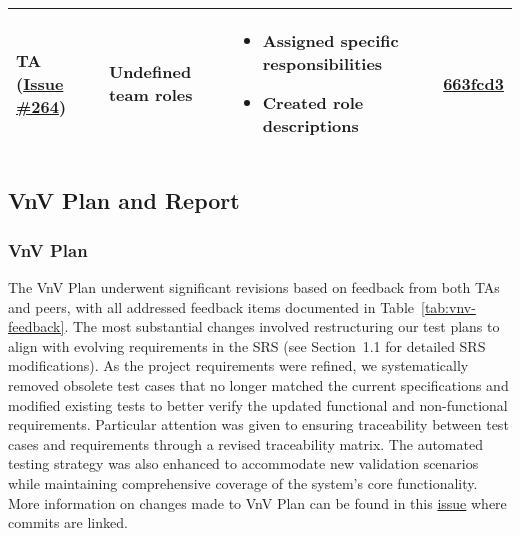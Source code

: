 \documentclass{article}
\begin{document}
\begin{longtable}{|p{2cm}|p{3.5cm}|p{4.5cm}|p{3cm}|}
    TA (\href{https://github.com/ssm-lab/capstone--source-code-optimizer/issues/264}{Issue \#264}) & 
    Undefined team roles &
    \begin{itemize}[nosep,leftmargin=*]
        \item Assigned specific responsibilities
        \item Created role descriptions
    \end{itemize} &
    \href{https://github.com/ssm-lab/capstone--source-code-optimizer/commit/663fcd3}{663fcd3} \\
    \hline
    
\end{longtable}

\subsection{VnV Plan and Report}

\subsubsection{VnV Plan}
The VnV Plan underwent significant revisions based on feedback from both TAs and peers, with all addressed feedback items documented in Table~\ref{tab:vnv-feedback}. The most substantial changes involved restructuring our test plans to align with evolving requirements in the SRS (see Section~1.1 for detailed SRS modifications). As the project requirements were refined, we systematically removed obsolete test cases that no longer matched the current specifications and modified existing tests to better verify the updated functional and non-functional requirements. Particular attention was given to ensuring traceability between test cases and requirements through a revised traceability matrix. The automated testing strategy was also enhanced to accommodate new validation scenarios while maintaining comprehensive coverage of the system's core functionality.\\

\noindent More information on changes made to VnV Plan can be found in this \href{https://github.com/ssm-lab/capstone--source-code-optimizer/issues/528}{issue} where commits are linked.
\end{document}
